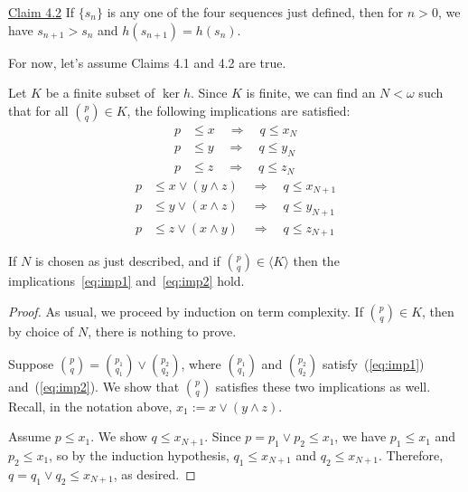 {\bigskip

\noindent \underline{Claim 4.2} If $\{s_n\}$ is any one of the four sequences just defined, then for $n>0$, we have $s_{n+1} > s_n$ and $h(s_{n+1}) = h(s_n)$.

\medskip


\bigskip

\noindent For now, let's assume Claims 4.1 and 4.2 are true.

\newpage

\noindent Let $K$ be a finite subset of $\ker h$.  Since $K$ is finite, we can find an $N < \omega$ such that for all $\binom{p}{q} \in K$, the following implications are satisfied:
\begin{align}
p &\leqslant x \quad \Longrightarrow \quad q \leqslant x_N\nonumber\\
p &\leqslant y \quad \Longrightarrow \quad q \leqslant y_N\label{eq:imp1}\\
p &\leqslant z \quad \Longrightarrow \quad q \leqslant z_N\nonumber
\end{align}
\begin{align}
p &\leqslant x \vee (y \wedge z) \quad \Longrightarrow \quad q \leqslant x_{N+1}\nonumber\\
p &\leqslant y \vee (x \wedge z) \quad \Longrightarrow \quad q \leqslant y_{N+1}\label{eq:imp2}\\
p &\leqslant z \vee (x \wedge y) \quad \Longrightarrow \quad q \leqslant z_{N+1}\nonumber
\end{align}

\medskip

 If $N$ is chosen as just described, and if $\binom{p}{q} \in \langle K \rangle$ then the implications~\ref{eq:imp1} and~\ref{eq:imp2} hold.

\begin{proof}
  As usual, we proceed by induction on term complexity.
If $\binom{p}{q} \in K$, then by choice of $N$, there is nothing to prove.

\medskip
{} Suppose $\binom{p}{q} = \binom{p_1}{q_1} \vee \binom{p_2}{q_2}$, where $\binom{p_1}{q_1}$ and $\binom{p_2}{q_2}$ satisfy~(\ref{eq:imp1}) and~(\ref{eq:imp2}). We show that $\binom{p}{q}$ satisfies these two implications as well.
Recall, in the notation above, $x_1:=x \vee (y \wedge z)$.


Assume $p\leqslant x_1$. We show $q \leq x_{N+1}$.
Since $p = p_1 \vee p_2 \leq x_1$, we have 
$p_1 \leqslant x_1$ and 
$p_2 \leqslant x_1$, so by the induction hypothesis,  
$q_1 \leqslant x_{N+1}$ and 
$q_2 \leqslant x_{N+1}$.  Therefore, $q = q_1 \vee q_2 \leq x_{N+1}$, as desired.


\end{proof}}
